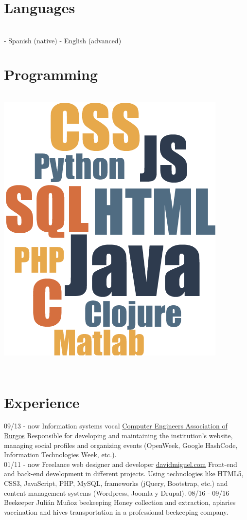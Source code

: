 \documentclass[]{friggeri-cv}
\begin{document}
\begin{aside}
  \section{Languages}
    \\[0.3cm]
    - Spanish (native)
    - English (advanced)
    ~       
  \section{Programming}
    \\[0.3cm]
    \includegraphics[scale=0.9]{img/cloud.png}
    ~    
\end{aside}
~
\\ [0.8cm]
\section{Experience}
\begin{entrylist}
    \entry
    {09/13 - now}
    {Information systems vocal}
    {\href{http://abi2burgos.es/}{Computer Engineers Association of Burgos}}
    {Responsible for developing and maintaining the institution's website, managing social profiles and organizing events (OpenWeek, Google HashCode, Information Technologies Week, etc.).\\}
    \entry
    {01/11 - now}
    {Freelance web designer and developer}
    {\href{http://davidmiguel.com/}{davidmiguel.com}}
    {Front-end and back-end development in different projects. Using technologies like HTML5, CSS3, JavaScript, PHP, MySQL, frameworks (jQuery, Bootstrap, etc.) and content management systems (Wordpress, Joomla y Drupal).
    }
    \entry
    {08/16 - 09/16}
    {Beekeeper}
    {Julián Muñoz beekeeping}
    {Honey collection and extraction, apiaries vaccination and hives transportation in a professional beekeeping company.\\}
\end{entrylist}
\end{document}
